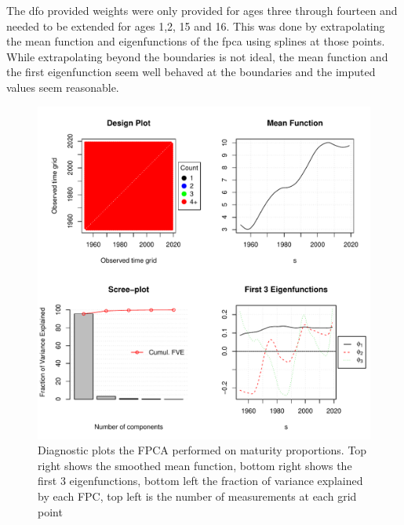 \documentclass[11pt]{article}\usepackage[]{graphicx}\usepackage[]{color}
\makeatletter
\def\maxwidth{ %
  \ifdim\Gin@nat@width>\linewidth
    \linewidth
  \else
    \Gin@nat@width
  \fi
}
\newenvironment{knitrout}{}{} %
\makeatother
\begin{document}
 The \acrshort{dfo} provided weights were only provided for ages three through fourteen and needed to be extended for ages 1,2, 15 and 16. This was done by extrapolating the mean function and eigenfunctions of the \acrshort{fpca} using splines at those points. While extrapolating beyond the boundaries is not ideal, the mean function and the first eigenfunction seem well behaved at the boundaries and the imputed values seem reasonable. 




\begin{knitrout}
\color{fgcolor}\begin{figure}
\includegraphics[width=\maxwidth]{figure/matFPCAd-1} \caption[Diagnostic plots the FPCA performed on maturity proportions]{Diagnostic plots the FPCA performed on maturity proportions. Top right shows the smoothed mean function, bottom right shows the first 3 eigenfunctions, bottom left the fraction of variance explained by each FPC, top left is the number of measurements at each grid point}\label{fig:matFPCAd}
\end{figure}


\end{knitrout}
\end{document}
